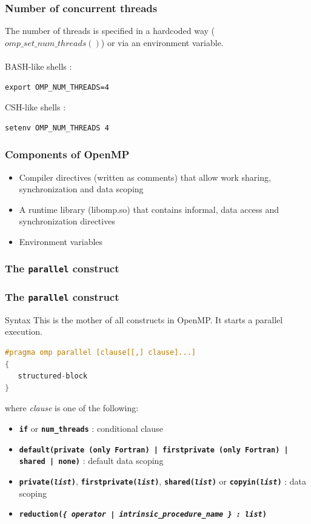 \begin{frame}[containsverbatim]
  \frametitle{Number of concurrent threads}

  The number of threads is specified in a hardcoded way ($omp\_set\_num\_threads()$) or via an environment variable.
  \\~\\

  BASH-like shells :

\begin{verbatim}
export OMP_NUM_THREADS=4
\end{verbatim}

  CSH-like shells :

\begin{verbatim}
setenv OMP_NUM_THREADS 4
\end{verbatim}
\end{frame}


\begin{frame}[containsverbatim]
  \frametitle{Components of OpenMP}
  \begin{itemize}
  \item{Compiler directives (written as comments) that allow work sharing, synchronization and data scoping}
  \item{A runtime library (libomp.so) that contains informal, data access and synchronization directives}
  \item{Environment variables}
  \end{itemize}
\end{frame}


\subsubsection{The \texttt{parallel} construct}


\begin{frame}[containsverbatim]
  \frametitle{The \texttt{parallel} construct}

  \begin{exampleblock}{Syntax}
    This is the mother of all constructs in OpenMP. It starts a parallel execution.
    \begin{lstlisting}[language=C,frame=lines]
#pragma omp parallel [clause[[,] clause]...]
{
   structured-block
}
\end{lstlisting}
    where \textit{clause} is one of the following:
    \begin{itemize}
    \item \textbf{\texttt{if}} or \textbf{\texttt{num\_threads}} : conditional clause
    \item \textbf{\texttt{default(private (only Fortran) | firstprivate (only Fortran) | shared | none)}} : default data scoping
    \item \textbf{\texttt{private(\textit{list})}}, \textbf{\texttt{firstprivate(\textit{list})}}, \textbf{\texttt{shared(\textit{list})}} or \textbf{\texttt{copyin(\textit{list})}} : data scoping
    \item \textbf{\texttt{reduction(\textit{\{ operator | intrinsic\_procedure\_name \} : list})}}
    \end{itemize}
  \end{exampleblock}
\end{frame}


